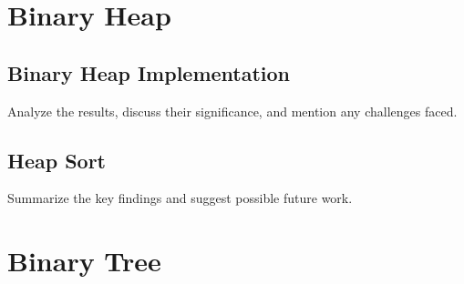 \documentclass[a4paper,12pt,twocolumn]{article}
\begin{document}
\section{Binary Heap}
\label{sec:binary-heap}
\subsection{Binary Heap Implementation}
Analyze the results, discuss their significance, and mention any challenges faced.

\subsection{Heap Sort}
Summarize the key findings and suggest possible future work.


\section{Binary Tree}
\label{sec:binary-tree}
\end{document}
